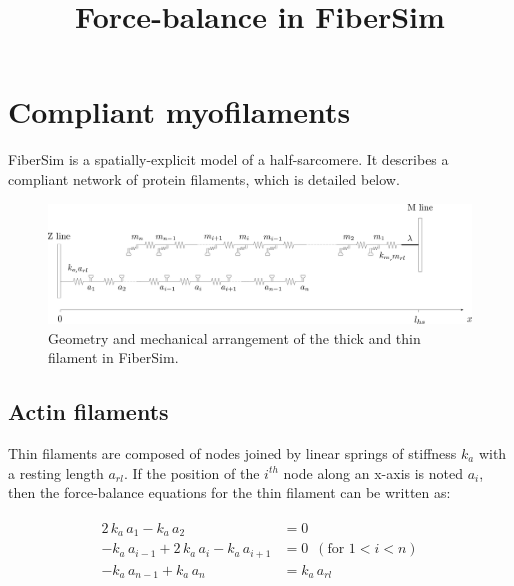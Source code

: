 \documentclass[a4paper,11pt]{article}
\begin{document}
\title{\LARGE Force-balance in FiberSim}
\date{}
\maketitle
\thispagestyle{empty}
\pagestyle{empty}

\section{Compliant myofilaments}

FiberSim is a spatially-explicit model of a half-sarcomere. It describes a compliant network of protein filaments, which is detailed below. 

\begin{figure}[h!]
\begin{center}
\includegraphics[width=15cm]{Pictures/Filaments.png}
\captionsetup{labelformat=empty}
\caption{Geometry and mechanical arrangement of the thick and thin filament in FiberSim.}
\end{center}
\end{figure}

\subsection{Actin filaments}

Thin filaments are composed of nodes joined by linear springs of stiffness $k_{a}$ with a resting length $a_{rl}$. If the position of the $i^{th}$ node along an x-axis is noted $a_i$, then the force-balance equations for the thin filament can be written as:

\begin{eqnarray}
\begin{aligned}
2 \, k_a \, a_1 - k_a \, a_2 &= 0 \\
-  k_a \, a_{i-1} + 2 \, k_a \, a_i - k_a \, a_{i+1} &= 0 \,\,\, (\mathrm{for} \,\, 1 < i < n) \\
-k_a \, a_{n-1} + k_a \, a_n &= k_a \, a_{rl} 
\label{thin}
\end{aligned}
\end{eqnarray}
\end{document}
